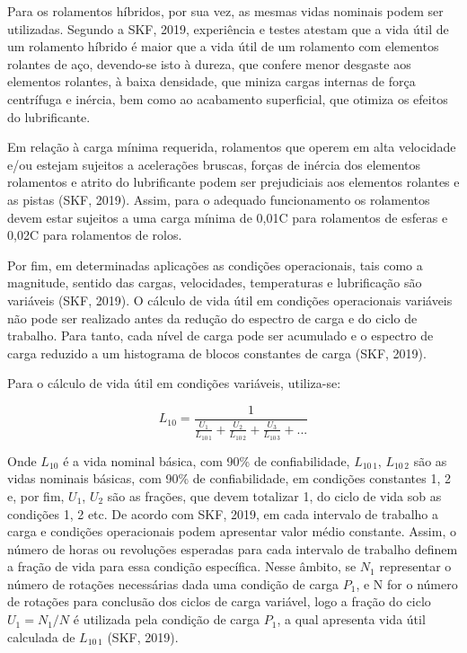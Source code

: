 \documentclass[
	12pt,				
	oneside,			
	a4paper,			
	english,			
	brazil,			
	]{abntex2ppgsi}
\begin{document}
Para os rolamentos híbridos, por sua vez, as mesmas vidas nominais podem ser utilizadas. Segundo a SKF, 2019, experiência e testes atestam que a vida útil de um rolamento híbrido é maior que a vida útil de um rolamento com elementos rolantes de aço, devendo-se isto à dureza, que confere menor desgaste aos elementos rolantes, à baixa densidade, que miniza cargas internas de força centrífuga e inércia, bem como ao acabamento superficial, que otimiza os efeitos do lubrificante.

Em relação à carga mínima requerida, rolamentos que operem em alta velocidade e/ou estejam sujeitos a acelerações bruscas, forças de inércia dos elementos rolamentos e atrito do lubrificante podem ser prejudiciais aos elementos rolantes e as pistas (SKF, 2019). Assim, para o adequado funcionamento os rolamentos devem estar sujeitos a uma carga mínima de 0,01C para rolamentos de esferas e 0,02C para rolamentos de rolos. 

Por fim, em determinadas aplicações as condições operacionais, tais como a magnitude, sentido das cargas, velocidades, temperaturas e lubrificação são variáveis (SKF, 2019). O cálculo de vida útil em condições operacionais variáveis não pode ser realizado antes da redução do espectro de carga e do ciclo de trabalho. Para tanto, cada nível de carga pode ser acumulado e o espectro de carga reduzido a um histograma de blocos constantes de carga (SKF, 2019).

Para o cálculo de vida útil em condições variáveis, utiliza-se:

\begin{equation}
	L_{10}= \frac{1}{ \frac{U_{1}}{L_{10 \,1}} + \frac{U_{2}}{L_{10 \,2}} + \frac{U_{3}}{L_{10 \,3}} + ...}
	\label{eq:Calculo da vida Util em condições variaveis}
\end{equation}

Onde $L_{10}$ é a vida nominal básica, com 90\% de confiabilidade, $L_{10 \,1}$, $L_{10 \,2}$ são as vidas nominais básicas, com 90\% de confiabilidade, em condições constantes 1, 2 e, por fim, $U_{1}$, $U_{2}$ são as frações, que devem totalizar 1, do ciclo de vida sob as condições 1, 2 etc. De acordo com SKF, 2019, em cada intervalo de trabalho a carga e condições operacionais podem apresentar valor médio constante. Assim, o número de horas ou revoluções esperadas para cada intervalo de trabalho definem a fração de vida para essa condição específica. Nesse âmbito, se ${N_{1}}$ representar o número de rotações necessárias dada uma condição de carga ${P_{1}}$, e N for o número de rotações para conclusão dos ciclos de carga variável, logo a fração do ciclo ${U_{1} = N_{1} / N}$ é utilizada pela condição de carga ${P_{1}}$, a qual apresenta vida útil calculada de ${L_{10 \,1}}$ (SKF, 2019).
\end{document}
